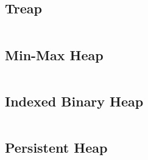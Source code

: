 \newpage

\subsection{Treap}

\hrulefill \vspace{-\baselineskip}
\begin{multicols}{2}
\inputminted[autogobble,fontsize=\tiny]{C++}{Data Structures/treap.cpp}
\end{multicols}
\vspace{-\baselineskip}
\noindent \hrulefill

\newpage

\subsection{Min-Max Heap}

\hrulefill \vspace{-\baselineskip}
\begin{multicols}{2}
\inputminted[autogobble,fontsize=\tiny]{C++}{Data Structures/min_max_heap.cpp}
\end{multicols}
\vspace{-\baselineskip}
\noindent \hrulefill

\subsection{Indexed Binary Heap}

\hrulefill \vspace{-\baselineskip}
\begin{multicols}{2}
\inputminted[autogobble,fontsize=\tiny]{C++}{Data Structures/binary_indexed_heap.cpp}
\end{multicols}
\vspace{-\baselineskip}
\noindent \hrulefill

\subsection{Persistent Heap}

\hrulefill \vspace{-\baselineskip}
\begin{multicols}{2}
\inputminted[autogobble,fontsize=\tiny]{C++}{Data Structures/persistent_heap.cpp}
\end{multicols}
\vspace{-\baselineskip}
\noindent \hrulefill

